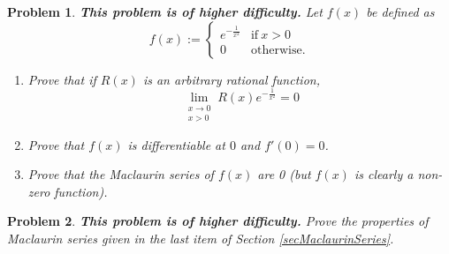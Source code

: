 \documentclass[12pt]{book}
\newtheorem{problem}{Problem}[section]
\newcommand{\doublebrace}[4]{\left\{\begin{array}{ll} #1 & #2 \\#3 & #4  \end{array} \right.}
\begin{document}
\begin{problem}\label{probDifferentiableNonAnalyticFunctionExample}
 \textbf{This problem is of higher difficulty.}
Let $f(x)$ be defined as 
\[
f(x):=\doublebrace{e^{-\frac{1}{x^2}}}{\mathrm{if~} x>0}{0}{\mathrm{otherwise.}}
\]
\begin{enumerate}
\item Prove that if $R(x)$ is an arbitrary rational function, 
\[
\lim\limits_{\substack{x\to 0\\ x>0}} R(x)e^{-\frac{1}{x^2}}=0
\]
\item Prove that $f(x)$ is differentiable at $0$ and $f'(0)=0$.
\item Prove that the Maclaurin series of $f(x)$ are 0 (but $f(x)$ is clearly a non-zero function).
\end{enumerate}

\end{problem}
\begin{problem}\textbf{This problem is of higher difficulty.} Prove the properties of Maclaurin series given in the last item of Section \ref{secMaclaurinSeries}.
\end{problem}
\end{document}
